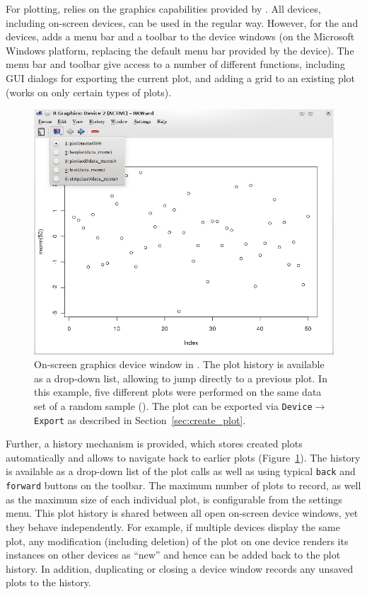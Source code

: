 For plotting,  relies on the graphics capabilities provided by
. All 
devices, including on{}-screen devices, can be used in the regular way.
However, for the  and  devices,  adds a menu
bar and a toolbar to the device windows (on the Microsoft Windows platform,
replacing the default menu bar provided by the device). The menu
bar and toolbar give access to a number of different functions,
including GUI dialogs for exporting the current plot,
and adding a grid to an existing plot 
(works on only certain types of plots).

\begin{figure}[b!]
 \centering
 \includegraphics{./figures/plot_history_cropped.png}
 \caption{On{}-screen graphics device window in . The plot history is 
  available as a drop-down list, allowing to jump directly to a previous 
  plot. In this example, five different plots were performed on the same data 
  set of a random sample (). The plot can be 
  exported via \texttt{Device$\rightarrow$Export} as described in Section~\ref{sec:create_plot}.
}
 \label{fig:plot_history}
\end{figure}

Further, a history mechanism is provided,
which stores created plots automatically and allows to navigate
back to earlier plots (Figure~\ref{fig:plot_history}). 
The history is available as a drop-down list of the plot calls as well as using typical \texttt{back}
and \texttt{forward} buttons on the toolbar.
The maximum number
of plots to record, as well as the maximum size of each individual plot,
is configurable from the settings menu. This plot history is shared
between all open on{}-screen device windows, yet they behave
independently. For example, if multiple devices display the same
plot, any modification (including deletion) of the plot on one device
renders its instances on other devices as ``new'' and hence can be added
back to the plot history. In addition, duplicating or closing a device
window records any unsaved plots to the history.

